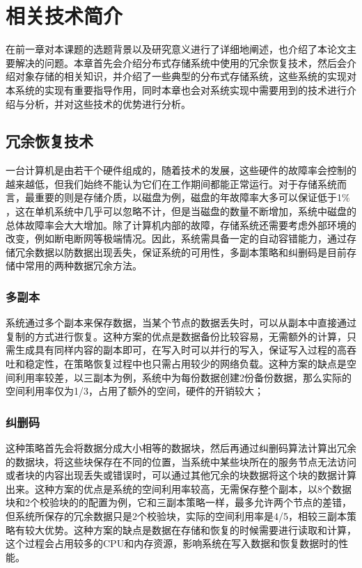 
\chapter{相关技术简介}
在前一章对本课题的选题背景以及研究意义进行了详细地阐述，也介绍了本论文主要解决的问题。本章首先会介绍分布式存储系统中使用的冗余恢复技术，然后会介绍对象存储的相关知识，并介绍了一些典型的分布式存储系统，这些系统的实现对本系统的实现有重要指导作用，同时本章也会对系统实现中需要用到的技术进行介绍与分析，并对这些技术的优势进行分析。

\section{冗余恢复技术}%
一台计算机是由若干个硬件组成的，随着技术的发展，这些硬件的故障率会控制的越来越低，但我们始终不能认为它们在工作期间都能正常运行。对于存储系统而言，最重要的则是存储介质，以磁盘为例，磁盘的年故障率大多可以保证低于1$\%$\cite{38}，这在单机系统中几乎可以忽略不计，但是当磁盘的数量不断增加，系统中磁盘的总体故障率会大大增加。除了计算机内部的故障，存储系统还需要考虑外部环境的改变，例如断电断网等极端情况。因此，系统需具备一定的自动容错能力，通过存储冗余数据以防数据出现丢失，保证系统的可用性，多副本\cite{39}策略和纠删码\cite{40}是目前存储中常用的两种数据冗余方法。

\subsection{多副本}%
系统通过多个副本来保存数据，当某个节点的数据丢失时，可以从副本中直接通过复制的方式进行恢复。这种方案的优点是数据备份比较容易，无需额外的计算，只需生成具有同样内容的副本即可，在写入时可以并行的写入，保证写入过程的高吞吐和稳定性，在策略恢复过程中也只需占用较少的网络负载。这种方案的缺点是空间利用率较差，以三副本为例，系统中为每份数据创建2份备份数据，那么实际的空间利用率仅为1/3，占用了额外的空间，硬件的开销较大；

\subsection{纠删码}%
这种策略首先会将数据分成大小相等的数据块，然后再通过纠删码算法计算出冗余的数据块，将这些块保存在不同的位置，当系统中某些块所在的服务节点无法访问或者块的内容出现丢失或错误时，可以通过其他冗余的块数据将这个块的数据计算出来。这种方案的优点是系统的空间利用率较高，无需保存整个副本，以8个数据块和2个校验块的的配置为例，它和三副本策略一样，最多允许两个节点的差错，但系统所保存的冗余数据只是2个校验块，实际的空间利用率是4/5，相较三副本策略有较大优势。这种方案的缺点是数据在存储和恢复的时候需要进行读取和计算，这个过程会占用较多的CPU和内存资源，影响系统在写入数据和恢复数据时的性能。

